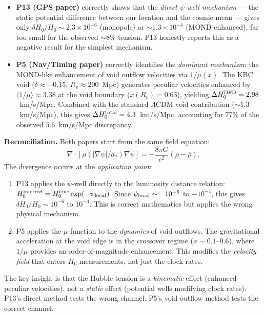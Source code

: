 \documentclass[aps,prd,twocolumn,superscriptaddress,nofootinbib]{revtex4-2}
\newcommand{\astar}{a_*}
\begin{document}
\begin{itemize}
\item \textbf{P13 (GPS paper)} correctly shows that the \emph{direct
$\psi$-well mechanism} --- the static potential difference between our
location and the cosmic mean --- gives only
$\delta H_0/H_0 \sim 2.3\times10^{-6}$ (monopole) or
$\sim 1.3\times10^{-4}$ (MOND-enhanced), far too small for the observed
$\sim 8\%$ tension.  P13 honestly reports this as a negative result for
the simplest mechanism.

\item \textbf{P5 (Nav/Timing paper)} correctly identifies the
\emph{dominant mechanism}: the MOND-like enhancement of void outflow
velocities via $1/\mu(x)$.  The KBC void ($\delta \approx -0.15$,
$R_v \approx 200$~Mpc) generates peculiar velocities enhanced by
$\langle 1/\mu \rangle \approx 3.38$ at the void boundary
($x(R_v) = 0.63$), yielding
$\Delta H_0^{\rm DFD} = 2.98$~km/s/Mpc.  Combined with the standard
$\Lambda$CDM void contribution ($\sim 1.3$~km/s/Mpc), this gives
$\Delta H_0^{\rm total} = 4.3$~km/s/Mpc, accounting for 77\% of the
observed $5.6$~km/s/Mpc discrepancy.
\end{itemize}

\textbf{Reconciliation.}  Both papers start from the same field equation:
\begin{equation}
\nabla\cdot[\mu(|\nabla\psi|/\astar)\nabla\psi]
= -\frac{8\pi G}{c^2}(\rho - \bar\rho).
\label{eq:field-eq}
\end{equation}
The divergence occurs at the \emph{application point}:

\begin{enumerate}
\item P13 applies the $\psi$-well directly to the luminosity distance
relation:
$H_0^{\rm inferred} = H_0^{\rm true}\exp(-\psi_{\rm local})$.
Since $\psi_{\rm local} \sim -10^{-6}$ to $-10^{-4}$, this gives
$\delta H_0/H_0 \sim 10^{-6}$ to $10^{-4}$.  This is correct
mathematics but applies the wrong physical mechanism.

\item P5 applies the $\mu$-function to the \emph{dynamics} of void
outflows.  The gravitational acceleration at the void edge is in the
crossover regime ($x \sim 0.1$--$0.6$), where $1/\mu$ provides an
order-of-magnitude enhancement.  This modifies the \emph{velocity field}
that enters $H_0$ measurements, not just the clock rates.
\end{enumerate}

The key insight is that the Hubble tension is a \emph{kinematic} effect
(enhanced peculiar velocities), not a \emph{static} effect (potential
wells modifying clock rates).  P13's direct method tests the wrong
channel.  P5's void outflow method tests the correct channel.
\end{document}
